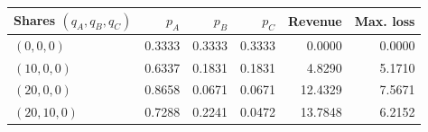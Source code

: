 \begin{tabular}{lrrrrr}
\toprule
Shares $(q_A,q_B,q_C)$ & $p_A$ & $p_B$ & $p_C$ & Revenue & Max. loss \\
\midrule
$(0,0,0)$ & 0.3333 & 0.3333 & 0.3333 & 0.0000 & 0.0000 \\
$(10,0,0)$ & 0.6337 & 0.1831 & 0.1831 & 4.8290 & 5.1710 \\
$(20,0,0)$ & 0.8658 & 0.0671 & 0.0671 & 12.4329 & 7.5671 \\
$(20,10,0)$ & 0.7288 & 0.2241 & 0.0472 & 13.7848 & 6.2152 \\
\bottomrule
\end{tabular}
